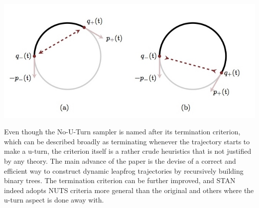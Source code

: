 \documentclass[12pt]{report}
\begin{document}
\includegraphics[scale=0.5]{cropped_nuts_image}

Even though the No-U-Turn sampler is named after its termination criterion, which can be described broadly as terminating whenever the trajectory starts to make a u-turn, the criterion itself is a rather crude heuristics that is not justified by any theory. The main advance of the paper is the devise of a correct and efficient way to construct dynamic leapfrog trajectories by recursively building binary trees. The termination criterion can be further improved, and STAN indeed adopts NUTS criteria more general than the original and others where the u-turn aspect is done away with. 
\end{document}
